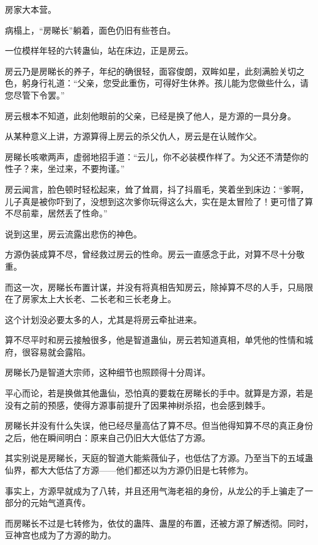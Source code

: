 
\begin{this_body}

房家大本营。

病榻上，“房睇长”躺着，面色仍旧有些苍白。

一位模样年轻的六转蛊仙，站在床边，正是房云。

房云乃是房睇长的养子，年纪的确很轻，面容俊朗，双眸如星，此刻满脸关切之色，躬身行礼道：“父亲，您受此重伤，可得好生休养。孩儿能为您做些什么，请您尽管下令罢。”

房云根本不知道，此刻他眼前的父亲，已经是换了他人，是方源的一具分身。

从某种意义上讲，方源算得上房云的杀父仇人，房云是在认贼作父。

房睇长咳嗽两声，虚弱地招手道：“云儿，你不必装模作样了。为父还不清楚你的性子？来，坐过来，不要拘谨。”

房云闻言，脸色顿时轻松起来，耸了耸肩，抖了抖眉毛，笑着坐到床边：“爹啊，儿子真是被你吓到了，没想到这次爹你玩得这么大，实在是太冒险了！更可惜了算不尽前辈，居然丢了性命。”

说到这里，房云流露出悲伤的神色。

方源伪装成算不尽，曾经救过房云的性命。房云一直感念于此，对算不尽十分敬重。

而这一次，房睇长布置计谋，并没有将真相告知房云，除掉算不尽的人手，只局限在了房家太上大长老、二长老和三长老身上。

这个计划没必要太多的人，尤其是将房云牵扯进来。

算不尽平时和房云接触很多，他是智道蛊仙，房云若知道真相，单凭他的性情和城府，很容易就会露陷。

房睇长乃是智道大宗师，这种细节也照顾得十分周详。

平心而论，若是换做其他蛊仙，恐怕真的要栽在房睇长的手中。就算是方源，若是没有之前的预感，使得方源事前提升了因果神树杀招，也会感到棘手。

房睇长并没有什么失误，他已经尽量高估了算不尽。但当他得知算不尽的真正身份之后，他在瞬间明白：原来自己仍旧大大低估了方源。

其实别说是房睇长，天庭的智道大能紫薇仙子，也低估了方源。乃至当下的五域蛊仙界，都大大低估了方源——他们都还以为方源仍旧是七转修为。

事实上，方源早就成为了八转，并且还用气海老祖的身份，从龙公的手上骗走了一部分的元始气道真传。

而房睇长不过是七转修为，依仗的蛊阵、蛊屋的布置，还被方源了解透彻。同时，豆神宫也成为了方源的助力。


\end{this_body}
